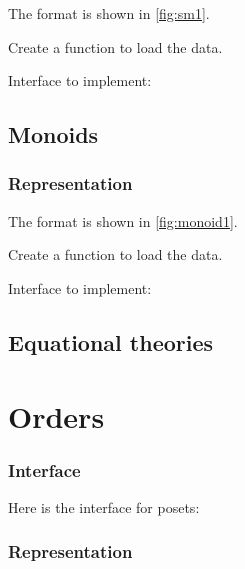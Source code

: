The format is shown in \cref{fig:sm1}.


\begin{exercise}[Representation]
  Create a function to load the data.

  Interface to implement:
%

\end{exercise}






\section{Monoids}


\subsection{Representation}

The format is shown in \cref{fig:monoid1}.



\begin{exercise}[Representation]
  Create a function to load the data.

  Interface to implement:
%

\end{exercise}


\section{Equational theories}



\chapter{Orders}


\subsection{Interface}

Here is the interface for posets:

%

\subsection{Representation}

